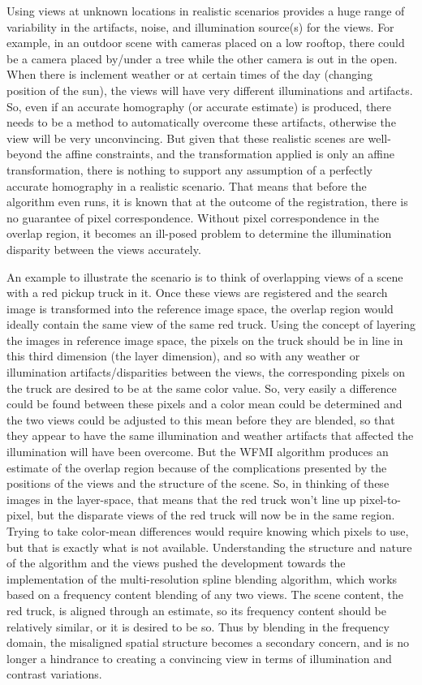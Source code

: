 Using views at unknown locations in realistic scenarios provides a huge range of variability in the artifacts, noise, and illumination source(s) for the views. For example, in an outdoor scene with cameras placed on a low rooftop, there could be a camera placed by/under a tree while the other camera is out in the open. When there is inclement weather or at certain times of the day (changing position of the sun), the views will have very different illuminations and artifacts. So, even if an accurate homography (or accurate estimate) is produced, there needs to be a method to automatically overcome these artifacts, otherwise the view will be very unconvincing. But given that these realistic scenes are well-beyond the affine constraints, and the transformation applied is only an affine transformation, there is nothing to support any assumption of a perfectly accurate homography in a realistic scenario. That means that before the algorithm even runs, it is known that at the outcome of the registration, there is no guarantee of pixel correspondence. Without pixel correspondence in the overlap region, it becomes an ill-posed problem to determine the illumination disparity between the views accurately.

An example to illustrate the scenario is to think of overlapping views of a scene with a red pickup truck in it. Once these views are registered and the search image is transformed into the reference image space, the overlap region would ideally contain the same view of the same red truck. Using the concept of layering the images in reference image space, the pixels on the truck should be in line in this third dimension (the layer dimension), and so with any weather or illumination artifacts/disparities between the views, the corresponding pixels on the truck are desired to be at the same color value. So, very easily a difference could be found between these pixels and a color mean could be determined and the two views could be adjusted to this mean before they are blended, so that they appear to have the same illumination and weather artifacts that affected the illumination will have been overcome. But the WFMI algorithm produces an estimate of the overlap region because of the complications presented by the positions of the views and the structure of the scene. So, in thinking of these images in the layer-space, that means that the red truck won't line up pixel-to-pixel, but the disparate views of the red truck will now be in the same region. Trying to take color-mean differences would require knowing which pixels to use, but that is exactly what is not available. Understanding the structure and nature of the algorithm and the views pushed the development towards the implementation of the multi-resolution spline blending algorithm, which works based on a frequency content blending of any two views. The scene content, the red truck, is aligned through an estimate, so its frequency content should be relatively similar, or it is desired to be so. Thus by blending in the frequency domain, the misaligned spatial structure becomes a secondary concern, and is no longer a hindrance to creating a convincing view in terms of illumination and contrast variations.

